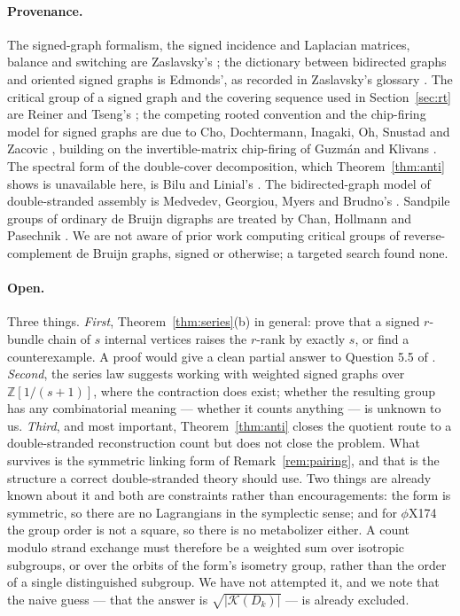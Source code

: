 \documentclass[11pt]{article}
\theoremstyle{plain}
\theoremstyle{definition}
\theoremstyle{remark}
\newcommand{\Z}{\mathbb{Z}}
\newcommand{\K}{\mathcal{K}}
\begin{document}
\paragraph{Provenance.} The signed-graph formalism, the signed incidence and Laplacian
matrices, balance and switching are Zaslavsky's \cite{Zas82}; the dictionary between
bidirected graphs and oriented signed graphs is Edmonds', as recorded in Zaslavsky's glossary
\cite{Zas98}. The critical group of a signed graph and the covering sequence used in
Section~\ref{sec:rt} are Reiner and Tseng's \cite{RT14}; the competing rooted convention and
the chip-firing model for signed graphs are due to Cho, Dochtermann, Inagaki, Oh, Snustad and
Zacovic \cite{CDIOSZ}, building on the invertible-matrix chip-firing of Guzm\'an and Klivans
\cite{GK16}. The spectral form of the double-cover decomposition, which
Theorem~\ref{thm:anti} shows is unavailable here, is Bilu and Linial's \cite{BL06}. The
bidirected-graph model of double-stranded assembly is Medvedev, Georgiou, Myers and Brudno's
\cite{MGMB07}. Sandpile groups of ordinary de Bruijn digraphs are treated by Chan, Hollmann
and Pasechnik \cite{CHP15}. We are not aware of prior work computing critical groups of
reverse-complement de Bruijn graphs, signed or otherwise; a targeted search found none.

\paragraph{Open.} Three things.
\emph{First}, Theorem~\ref{thm:series}(b) in general: prove that a signed $r$-bundle chain of
$s$ internal vertices raises the $r$-rank by exactly $s$, or find a counterexample. A proof
would give a clean partial answer to Question 5.5 of \cite{CDIOSZ}.
\emph{Second}, the series law suggests working with weighted signed graphs over
$\Z[1/(s{+}1)]$, where the contraction does exist; whether the resulting group has any
combinatorial meaning --- whether it counts anything --- is unknown to us.
\emph{Third}, and most important, Theorem~\ref{thm:anti} closes the quotient route to a
double-stranded reconstruction count but does not close the problem. What survives is the
symmetric linking form of Remark~\ref{rem:pairing}, and that is the structure a correct
double-stranded theory should use. Two things are already known about it and both are
constraints rather than encouragements: the form is symmetric, so there are no Lagrangians
in the symplectic sense; and for $\phi$X174 the group order is not a square, so there is no
metabolizer either. A count modulo strand exchange must therefore be a weighted sum over
isotropic subgroups, or over the orbits of the form's isometry group, rather than the order
of a single distinguished subgroup. We have not attempted it, and we note that the naive
guess --- that the answer is $\sqrt{|\K(D_k)|}$ --- is already excluded.
\end{document}
